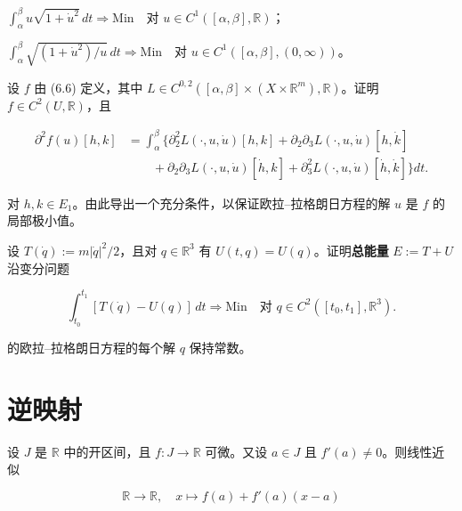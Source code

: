 \begin{exercises}
\begin{items}
$ \int_{\alpha}^{\beta} u\sqrt{1 + \dot{u}^{2}} \, dt \Rightarrow \mathrm{Min} \quad \text{对 } u \in C^{1}([\alpha, \beta], \mathbb{R}) $；

\item

$ \int_{\alpha}^{\beta} \sqrt{(1 + \dot{u}^{2})/u} \, dt \Rightarrow \mathrm{Min} \quad \text{对 } u \in C^{1}([\alpha, \beta], (0, \infty)) $。

\end{items}

\item

设 $ f $ 由 (6.6) 定义，其中 $ L \in C^{0,2}([\alpha, \beta] \times (X \times \mathbb{R}^{m}), \mathbb{R}) $。证明 $ f \in C^{2}(U, \mathbb{R}) $，且

\begin{equation*}
\begin{aligned}
\partial^{2} f(u)[h, k] &= \int_{\alpha}^{\beta} \Big\{ \partial_{2}^{2} L(\cdot, u, \dot{u})[h, k] + \partial_{2}\partial_{3} L(\cdot, u, \dot{u})[h, \dot{k}] \\ &\qquad{}+ \partial_{2}\partial_{3} L(\cdot, u, \dot{u})[\dot{h}, k] + \partial_{3}^{2} L(\cdot, u, \dot{u})[\dot{h}, \dot{k}] \Big\} dt .
\end{aligned}
\end{equation*}

对 $ h, k \in E_{1} $。由此导出一个充分条件，以保证欧拉–拉格朗日方程的解 $ u $ 是 $ f $ 的局部极小值。

\item

设 $ T(\dot{q}) := m|\dot{q}|^{2}/2 $，且对 $ q \in \mathbb{R}^{3} $ 有 $ U(t, q) = U(q) $。证明\textbf{总能量} $ E := T + U $ 沿变分问题

\[
\int_{t_{0}}^{t_{1}} [T(\dot{q}) - U(q)] \, dt \Rightarrow \mathrm{Min} \quad \text{对 } q \in C^{2}([t_{0}, t_{1}], \mathbb{R}^{3}) .
\]

的欧拉–拉格朗日方程的每个解 $ q $ 保持常数。

\end{exercises}

\section{逆映射}

设 $ J $ 是 $ \mathbb{R} $ 中的开区间，且 $ f : J \to \mathbb{R} $ 可微。又设 $ a \in J $ 且 $ f'(a) \ne 0 $。则线性近似

\[
\mathbb{R} \to \mathbb{R} , \quad x \mapsto f(a) + f'(a)(x - a)
\]

